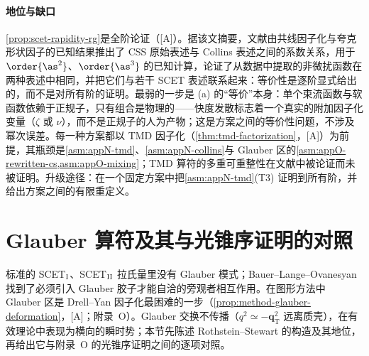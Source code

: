 \paragraph{地位与缺口}
\cref{prop:scet-rapidity-rg}是全阶论证（[A]）。据该文摘要，文献\cite{Collins:2017oxh}由共线因子化与夸克形状因子的已知结果推出了 CSS 原始表述与 Collins 表述之间的系数关系，用于 $\order{\as^2}$、$\order{\as^3}$ 的已知计算，论证了从数据中提取的非微扰函数在两种表述中相同，并把它们与若干 SCET 表述联系起来：等价性是逐阶显式给出的，而不是对所有阶的证明。最弱的一步是 (a) 的“等价”本身：单个束流函数与软函数依赖于正规子，只有组合是物理的——快度发散标志着一个真实的附加因子化变量（$\zeta$ 或 $\nu$），而不是正规子的人为产物；这是方案之间的等价性问题，不涉及幂次误差。每一种方案都以 TMD 因子化（\cref{thm:tmd-factorization}，[A]）为前提，其瓶颈是\cref{asm:appN-tmd}、\cref{asm:appN-collins}与 Glauber 区的\cref{asm:appO-rewritten-cs,asm:appO-mixing}；TMD 算符的多重可重整性在文献中被论证而未被证明\cite[第~13~章]{Collins2011}。升级途径：在一个固定方案中把\cref{asm:appN-tmd}(T3) 证明到所有阶，并给出方案之间的有限重定义。

\section{Glauber 算符及其与光锥序证明的对照}\label{sec:scet-glauber}

标准的 SCET$_{\rm I}$、SCET$_{\rm II}$ 拉氏量里没有 Glauber 模式；Bauer--Lange--Ovanesyan 找到了必须引入 Glauber 胶子才能自洽的旁观者相互作用\cite{Bauer:2010cc}。在图形方法中 Glauber 区是 Drell--Yan 因子化最困难的一步（\cref{prop:method-glauber-deformation}，[A]；附录~O）。Glauber 交换不传播（$q^2\simeq-\bm q_{\mathrm T}^2$ 远离质壳），在有效理论中表现为横向的瞬时势；本节先陈述 Rothstein--Stewart 的构造及其地位，再给出它与附录~O 的光锥序证明之间的逐项对照。

